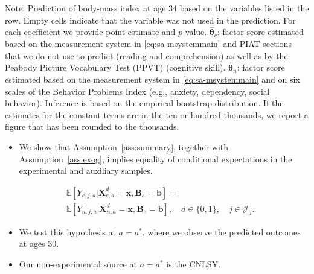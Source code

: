\documentclass[static]{JJH-Beamer}
\begin{document}
\begin{frame}
\begin{table}[H]
\begin{center}
{}
\end{center}
\tiny \flushleft
Note: Prediction of body-mass index at age 34 based on the variables listed in the row. Empty cells indicate that the variable was not used in the prediction. For each coefficient we provide point estimate and $p$-value. $\hat{\bm{\theta}}_{c}$: factor score estimated based on the measurement system in \eqref{eq:sa-msystemmain} and PIAT sections that we do not use to predict (reading and comprehension) as well as by the Peabody Picture Vocabulary Test (PPVT) (cognitive skill). $\hat{\bm{\theta}}_{n}$: factor score estimated based on the measurement system in \eqref{eq:sa-msystemmain} and on six scales of the Behavior Problems Index (e.g., anxiety, dependency, social behavior). Inference is based on the empirical bootstrap distribution. If the estimates for the constant terms are in the ten or hundred thousands, we report a figure that has been rounded to the thousands.\\
\end{table}

\end{frame}

\begin{frame}
 \addtocounter{framenumber}{-1}

\begin{itemize}
\item We show that Assumption~\ref{ass:summary}, together with Assumption~\ref{ass:exog}, implies equality of conditional expectations in the experimental and auxiliary samples.
\end{itemize}

\begin{align}
&\mathbb{E} \left[ Y_{e,j,a} | \bm{X}^d_{e,a} = \bm{x}, \bm{B}_e = \bm{b} \right] = \\
&\mathbb{E} \left[ Y_{n,j,a} | \bm{X}^d_{n,a} = \bm{x}, \bm{B}_e = \bm{b} \right], \quad d \in \{0,1\}, \quad j \in \mathcal{J}_a. \nonumber
\end{align}

\begin{itemize}
\item We test this hypothesis at $a = a^*$, where we observe the predicted outcomes at ages 30.
\item Our non-experimental source at $a = a^*$ is the CNLSY.
\end{itemize}

\end{frame}
\end{document}
